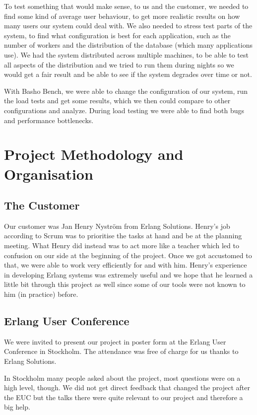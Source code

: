 \documentclass[11pt,a4paper]{report}
\begin{document}
To test something that would make sense, to us and the customer, we needed to
find some kind of average user behaviour, to get more realistic results on how
many users our system could deal with. We also needed to stress test parts of
the system, to find what configuration is best for each application, such as the
number of workers and the distribution of the database (which many applications
use). We had the system distributed across multiple machines, to be able to
test all aspects of the distribution and we tried to run them during nights so
we would get a fair result and be able to see if the system degrades over time
or not.

With Basho Bench, we were able to change the configuration of our system, run
the load tests and get some results, which we then could compare to other
configurations and analyze. During load testing we were able to find both bugs
and performance bottlenecks.

\chapter{Project Methodology and Organisation}

\section{The Customer}
Our customer was Jan Henry Nyström from Erlang Solutions\cite{erlsol}. Henry's
job according to Scrum was to prioritise the tasks at hand and be at the
planning meeting. What Henry did instead was to act more like a teacher which
led to confusion on our side at the beginning of the project. Once we got
accustomed to that, we were able to work very efficiently for and with him.
Henry's experience in developing Erlang systems was extremely useful and we hope
that he learned a little bit through this project as well since some of our
tools were not known to him (in practice) before.
\section{Erlang User Conference}
We were invited to present our project in poster form at the Erlang User
Conference in Stockholm\cite{euc2011}. The attendance was free of charge for us
thanks to Erlang Solutions.

In Stockholm many people asked about the project, most questions were on a high
level, though. We did not get direct feedback that changed the project after the
EUC but the talks there were quite relevant to our project and therefore a big
help.
\end{document}
